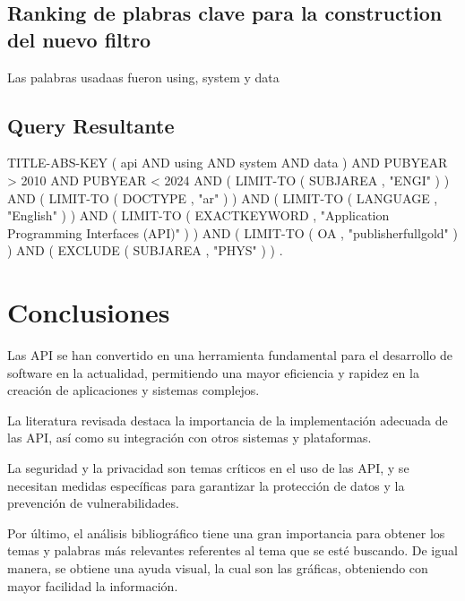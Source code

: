 \documentclass[journal, spanish]{IEEEtran}
\begin{document}
\subsection{Ranking de plabras clave para la construction del nuevo filtro}

Las palabras usadaas fueron using, system y data


\subsection{Query Resultante}

TITLE-ABS-KEY ( api  AND  using  AND  system  AND  data )  AND  PUBYEAR  >  2010  AND  PUBYEAR  <  2024  AND  ( LIMIT-TO ( SUBJAREA ,  "ENGI" ) )  AND  ( LIMIT-TO ( DOCTYPE ,  "ar" ) )  AND  ( LIMIT-TO ( LANGUAGE ,  "English" ) )  AND  ( LIMIT-TO ( EXACTKEYWORD ,  "Application Programming Interfaces (API)" ) )  AND  (  LIMIT-TO ( OA ,  "publisherfullgold" ) )  AND  ( EXCLUDE ( SUBJAREA ,  "PHYS" ) ) .

\section{Conclusiones}

Las API se han convertido en una herramienta fundamental para el desarrollo de software en la actualidad, permitiendo una mayor eficiencia y rapidez en la creación de aplicaciones y sistemas complejos.

La literatura revisada destaca la importancia de la implementación adecuada de las API, así como su integración con otros sistemas y plataformas.

La seguridad y la privacidad son temas críticos en el uso de las API, y se necesitan medidas específicas para garantizar la protección de datos y la prevención de vulnerabilidades.

Por último, el análisis bibliográfico tiene una gran importancia para obtener los temas y palabras más relevantes referentes al tema que se esté buscando. De igual manera, se obtiene una ayuda visual, la cual son las gráficas, obteniendo con mayor facilidad la información.


\vspace{12pt}
\end{document}
